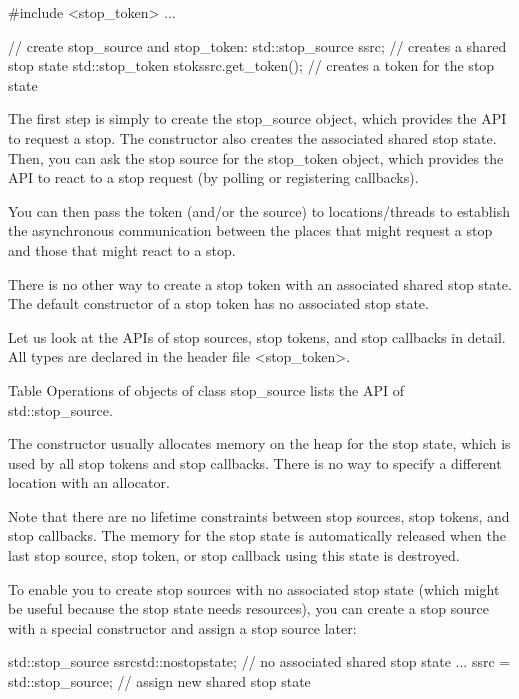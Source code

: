 \begin{cpp}
#include <stop_token>
...

// create stop_source and stop_token:
std::stop_source ssrc; // creates a shared stop state
std::stop_token stok{ssrc.get_token()}; // creates a token for the stop state
\end{cpp}

The first step is simply to create the stop\_source object, which provides the API to request a stop. The constructor also creates the associated shared stop state. Then, you can ask the stop source for the stop\_token object, which provides the API to react to a stop request (by polling or registering callbacks).

You can then pass the token (and/or the source) to locations/threads to establish the asynchronous communication between the places that might request a stop and those that might react to a stop.

There is no other way to create a stop token with an associated shared stop state. The default constructor of a stop token has no associated stop state.



Let us look at the APIs of stop sources, stop tokens, and stop callbacks in detail. All types are declared in the header file <stop\_token>.


Table Operations of objects of class stop\_source lists the API of std::stop\_source.

The constructor usually allocates memory on the heap for the stop state, which is used by all stop tokens and stop callbacks. There is no way to specify a different location with an allocator.

Note that there are no lifetime constraints between stop sources, stop tokens, and stop callbacks. The memory for the stop state is automatically released when the last stop source, stop token, or stop callback using this state is destroyed.

To enable you to create stop sources with no associated stop state (which might be useful because the stop state needs resources), you can create a stop source with a special constructor and assign a stop source later:

\begin{cpp}
std::stop_source ssrc{std::nostopstate}; // no associated shared stop state
...
ssrc = std::stop_source{}; // assign new shared stop state
\end{cpp}


